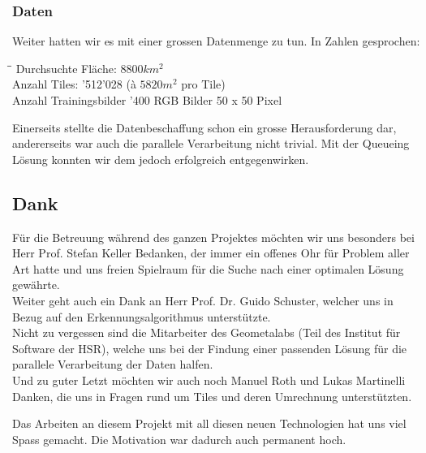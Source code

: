 \subsubsection{Daten}
Weiter hatten wir es mit einer grossen Datenmenge zu tun. In Zahlen gesprochen:
\begin{tabbing}
    \hspace*{8cm}\=\hspace*{4cm}\= \kill
    Durchsuchte Fläche: \> $8800 km^{2}$  \\
    Anzahl Tiles: '512'028 (à $5820 m^{2}$ pro Tile)\\
    Anzahl Trainingsbilder '400 RGB Bilder 50 x 50 Pixel \\
\end{tabbing}
Einerseits stellte die Datenbeschaffung schon ein grosse Herausforderung dar, andererseits war auch die parallele Verarbeitung nicht trivial. Mit der Queueing Lösung konnten wir dem jedoch erfolgreich entgegenwirken.
\newpage
\subsection{Dank}
Für die Betreuung während des ganzen Projektes möchten wir uns besonders bei Herr Prof. Stefan Keller Bedanken, der immer ein offenes Ohr für Problem aller Art hatte und uns freien Spielraum für die Suche nach einer optimalen Lösung gewährte. \\
Weiter geht auch ein Dank an Herr Prof. Dr.  Guido Schuster, welcher uns in Bezug auf den Erkennungsalgorithmus unterstützte. \\
Nicht zu vergessen sind die Mitarbeiter des Geometalabs (Teil des Institut für Software der HSR), welche uns bei der Findung einer passenden Lösung für die parallele Verarbeitung der Daten halfen.\\
Und zu guter Letzt möchten wir auch noch Manuel Roth und Lukas Martinelli Danken, die uns in Fragen rund um Tiles und deren Umrechnung unterstützten.

Das Arbeiten an diesem Projekt mit all diesen neuen Technologien hat uns viel Spass gemacht. Die Motivation war dadurch auch permanent hoch.
	
